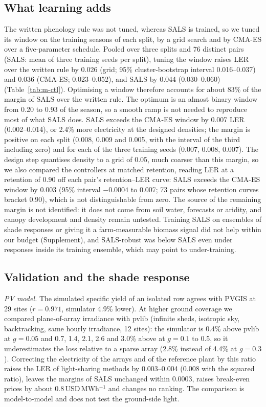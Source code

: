 \subsection{What learning adds}\label{sec:r-learning}
The written phenology rule was not tuned, whereas SALS is trained, so we tuned its window on the training seasons of each split, by a grid search and by CMA-ES over a five-parameter schedule. Pooled over three splits and 76 distinct pairs (SALS: mean of three training seeds per split), tuning the window raises LER over the written rule by 0.026 (grid; 95\% cluster-bootstrap interval 0.016--0.037) and 0.036 (CMA-ES; 0.023--0.052), and SALS by 0.044 (0.030--0.060) (Table~\ref{tab:m-ctl}). Optimising a window therefore accounts for about 83\% of the margin of SALS over the written rule. The optimum is an almost binary window from 0.20 to 0.93 of the season, so a smooth ramp is not needed to reproduce most of what SALS does. SALS exceeds the CMA-ES window by 0.007 LER (0.002--0.014), or 2.4\% more electricity at the designed densities; the margin is positive on each split (0.008, 0.009 and 0.005, with the interval of the third including zero) and for each of the three training seeds (0.007, 0.008, 0.007). The design step quantises density to a grid of 0.05, much coarser than this margin, so we also compared the controllers at matched retention, reading LER at a retention of 0.90 off each pair's retention--LER curve: SALS exceeds the CMA-ES window by 0.003 (95\% interval $-0.0004$ to 0.007; 73 pairs whose retention curves bracket 0.90), which is not distinguishable from zero. The source of the remaining margin is not identified: it does not come from soil water, forecasts or aridity, and canopy development and density remain untested. Training SALS on ensembles of shade responses or giving it a farm-measurable biomass signal did not help within our budget (Supplement), and SALS-robust was below SALS even under responses inside its training ensemble, which may point to under-training.



\subsection{Validation and the shade response}\label{sec:m-valid}
\emph{PV model.} The simulated specific yield of an isolated row agrees with PVGIS at 29 sites ($r=0.971$, simulator 4.9\% lower). At higher ground coverage we compared plane-of-array irradiance with pvlib \citep{holmgren2018} (infinite sheds, isotropic sky, backtracking, same hourly irradiance, 12 sites): the simulator is 0.4\% above pvlib at $g=0.05$ and 0.7, 1.4, 2.1, 2.6 and 3.0\% above at $g=0.1$ to 0.5, so it underestimates the loss relative to a sparse array (2.8\% instead of 4.4\% at $g=0.3$). Correcting the electricity of the arrays and of the reference plant by this ratio raises the LER of light-sharing methods by 0.003--0.004 (0.008 with the squared ratio), leaves the margins of SALS unchanged within 0.0003, raises break-even prices by about 0.8\,USD\,MWh$^{-1}$ and changes no ranking. The comparison is model-to-model and does not test the ground-side light.

